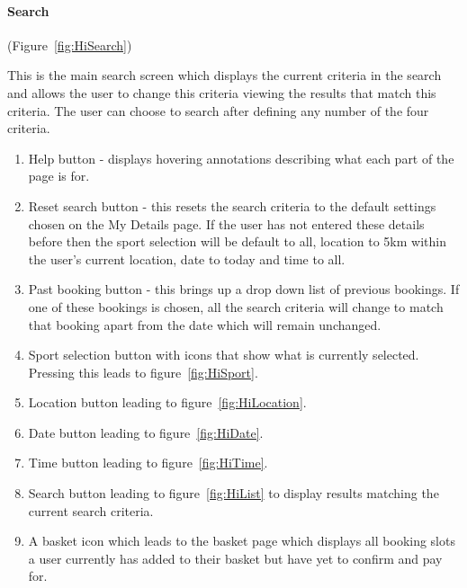 \paragraph{Search}

(Figure~\ref{fig:HiSearch})


This is the main search screen which displays the current criteria
in the search and allows the user to change this criteria viewing
the results that match this criteria. The user can choose to search
after defining any number of the four criteria.
\begin{enumerate}
	\item Help button - displays hovering annotations describing what each part
	      of the page is for.
	\item Reset search button - this resets the search criteria to the default
	      settings chosen on the My Details page. If the user has not entered
	      these details before then the sport selection will be default to all,
	      location to 5km within the user's current location, date to today
	      and time to all.
	\item Past booking button - this brings up a drop down list of previous
	      bookings. If one of these bookings is chosen, all the search criteria
	      will change to match that booking apart from the date which will remain
	      unchanged.
	\item Sport selection button with icons that show what is currently selected.
	      Pressing this leads to figure~\ref{fig:HiSport}.
	\item Location button leading to figure~\ref{fig:HiLocation}.
	\item Date button leading to figure~\ref{fig:HiDate}.
	\item Time button leading to figure~\ref{fig:HiTime}.
	\item Search button leading to figure~\ref{fig:HiList} to display results
	      matching the current search criteria.
	\item A basket icon which leads to the basket page which displays all booking
	      slots a user currently has added to their basket but have yet to confirm
	      and pay for.
\end{enumerate}

